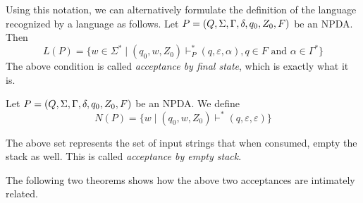Using this notation, we can alternatively formulate the definition of the language recognized by a language as follows.
Let $P=(Q,\Sigma,\Gamma,\delta,q_0,Z_0,F)$ be an NPDA. Then
$$L(P)=\{w\in \Sigma^* \mid (q_0,w,Z_0)\vdash^*_P(q,\varepsilon,\alpha), q\in F\text{ and }\alpha\in\Gamma^*\}$$
The above condition is called \textit{acceptance by final state}, which is exactly what it is.
\begin{definition}
Let $P=(Q,\Sigma,\Gamma,\delta,q_0,Z_0,F)$ be an NPDA. We define
$$N(P)=\{w\mid (q_0,w,Z_0)\vdash^*(q,\varepsilon,\varepsilon)\}$$
\end{definition}


The above set represents the set of input strings that when consumed, empty the stack as well. This is called \textit{acceptance by empty stack}.

The following two theorems shows how the above two acceptances are intimately related.

